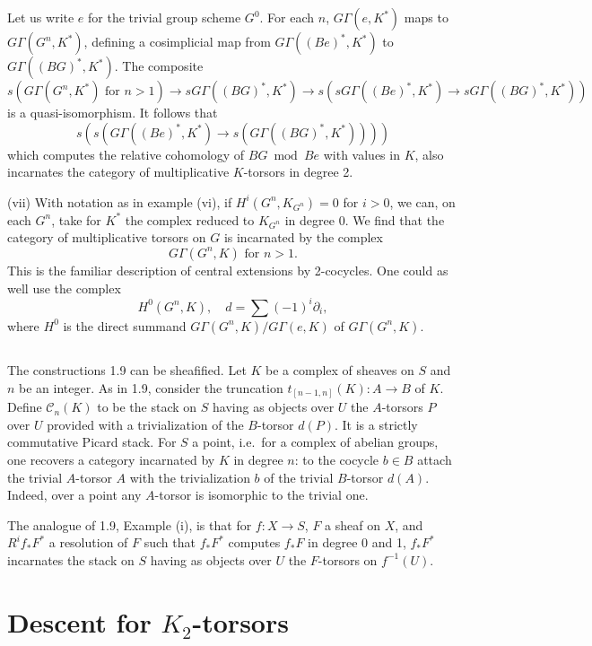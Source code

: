 \documentclass[11pt,a4paper]{article}
\theoremstyle{plain}
\theoremstyle{definition}
\newcommand{\cC}{\mathcal{C}}
\begin{document}
Let us write $e$ for the trivial group scheme $G^0$. For each $n$, $G\Gamma(e, K^*)$ maps to $G\Gamma(G^n, K^*)$, defining a cosimplicial map from $G\Gamma((Be)^*, K^*)$ to $G\Gamma((BG)^*, K^*)$. The composite
\[s(G\Gamma(G^n, K^*) \text{ for } n > 1) \to sG\Gamma((BG)^*, K^*) \to s(sG\Gamma((Be)^*, K^*) \to sG\Gamma((BG)^*, K^*))\]
is a quasi-isomorphism. It follows that
\begin{equation}\label{eq:1.9.2}
s(s(G\Gamma((Be)^*, K^*) \to s(G\Gamma((BG)^*, K^*))))
\end{equation}
which computes the relative cohomology of $BG \bmod Be$ with values in $K$, also incarnates the category of multiplicative $K$-torsors in degree 2.

(vii) With notation as in example (vi), if $H^i(G^n, K_{G^n}) = 0$ for $i > 0$, we can, on each $G^n$, take for $K^*$ the complex reduced to $K_{G^n}$ in degree 0. We find that the category of multiplicative torsors on $G$ is incarnated by the complex
\[G\Gamma(G^n, K) \text{ for } n > 1.\]
This is the familiar description of central extensions by 2-cocycles. One could as well use the complex
\[H^0(G^n, K), \quad d = \sum (-1)^i \partial_i,\]
where $H^0$ is the direct summand $G\Gamma(G^n, K)/G\Gamma(e, K)$ of $G\Gamma(G^n, K)$.

\subsection{}
The constructions 1.9 can be sheafified. Let $K$ be a complex of sheaves on $S$ and $n$ be an integer. As in 1.9, consider the truncation $t_{[n-1,n]}(K): A \to B$ of $K$. Define $\cC_n(K)$ to be the stack on $S$ having as objects over $U$ the $A$-torsors $P$ over $U$ provided with a trivialization of the $B$-torsor $d(P)$. It is a strictly commutative Picard stack. For $S$ a point, i.e.~for a complex of abelian groups, one recovers a category incarnated by $K$ in degree $n$: to the cocycle $b \in B$ attach the trivial $A$-torsor $A$ with the trivialization $b$ of the trivial $B$-torsor $d(A)$. Indeed, over a point any $A$-torsor is isomorphic to the trivial one.

The analogue of 1.9, Example (i), is that for $f: X \to S$, $F$ a sheaf on $X$, and $R^i f_* F^*$ a resolution of $F$ such that $f_* F^*$ computes $f_* F$ in degree 0 and 1, $f_* F^*$ incarnates the stack on $S$ having as objects over $U$ the $F$-torsors on $f^{-1}(U)$.

\section{Descent for $K_2$-torsors}
\end{document}
